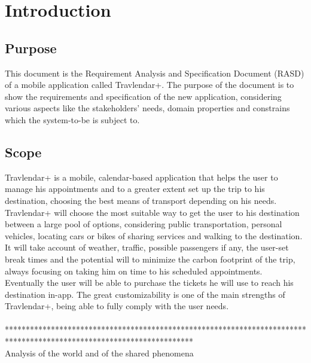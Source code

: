%
%
\chapter{Introduction}
%
\label{cap:introduction}
%
%
\section{Purpose}
This document is the Requirement Analysis and Specification Document (RASD) of a mobile application called Travlendar+. The purpose of the document is to show the requirements and specification of the new application, considering various aspects like the stakeholders' needs, domain properties and constrains which the system-to-be is subject to.
%
%
\section{Scope}
Travlendar+ is a mobile, calendar-based application that helps the user to manage his appointments and to a greater extent set up the trip to his destination, choosing the best means of transport depending on his needs. \\
Travlendar+ will choose the most suitable way to get the user to his destination between a large pool of options, considering public transportation, personal vehicles, locating cars or bikes of sharing services and walking to the destination. It will take account of weather, traffic, possible passengers if any, the user-set break times and the potential will to minimize the carbon footprint of the trip, always focusing on taking him on time to his scheduled appointments. \\
Eventually the user will be able to purchase the tickets he will use to reach his destination in-app. The great customizability is one of the main strengths of Travlendar+, being able to fully comply with the user needs. 
\\
\\
********************************************************************************************************************* \\
Analysis of the world and of the shared phenomena
%
%
